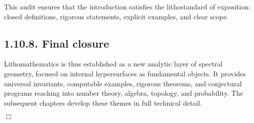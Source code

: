 This audit ensures that the introduction satisfies the lithostandard of exposition:
closed definitions, rigorous statements, explicit examples, and clear scope.

\subsection*{1.10.8. Final closure}

Lithomathematics is thus established as
a new analytic layer of spectral geometry,
focused on internal hypersurfaces as fundamental objects.
It provides universal invariants,
computable examples,
rigorous theorems,
and conjectural programs reaching into number theory,
algebra, topology, and probability.
The subsequent chapters develop these themes in full technical detail.

\hfill $\Box$
